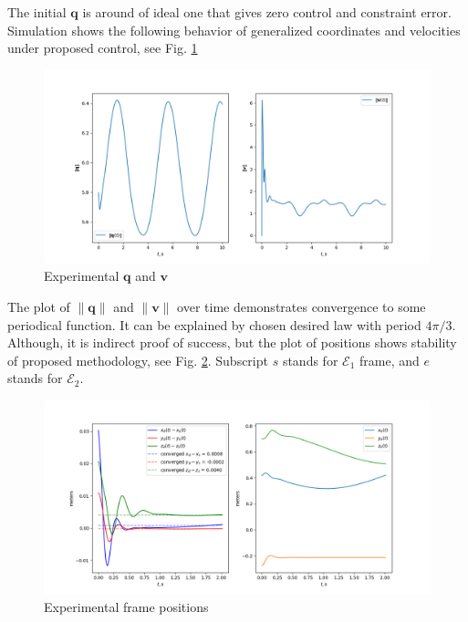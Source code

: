 The initial $\mathbf{q}$ is around of ideal one that gives zero control and 
constraint error. Simulation shows the following behavior of generalized 
coordinates and velocities under proposed control, see Fig. \ref{fig:q_and_v_plot}

\begin{figure}[H]
    \centering
    \includegraphics[scale=0.52]{figs/q_and_v_history.png}
    \caption{Experimental $\mathbf{q}$ and $\mathbf{v}$}
    \label{fig:q_and_v_plot}
\end{figure}

The plot of $\|\mathbf{q}\|$ and $\|\mathbf{v}\|$ over time demonstrates 
convergence to some periodical function. It can be explained by chosen 
desired law with period $4 \pi / 3$. Although, it is indirect proof of success, but 
the plot of positions shows stability of proposed methodology, see Fig. 
\ref{fig:poses_plot}. Subscript $s$ stands for $\mathcal{E}_1$ frame, 
and $e$ stands for $\mathcal{E}_2$.

\begin{figure}[H]
    \centering
    \includegraphics[scale=0.52]{figs/poses_history.png}
    \caption{Experimental frame positions}
    \label{fig:poses_plot}
\end{figure}

